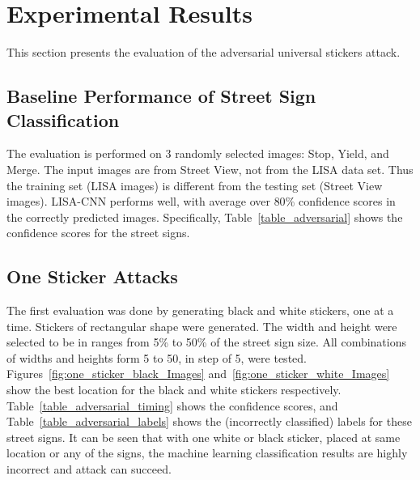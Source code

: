 \section{Experimental Results}
\label{experimental_results}

This section presents the evaluation of the adversarial universal stickers attack.


\subsection{Baseline Performance of Street Sign Classification}

The evaluation is performed on 3 randomly selected images: Stop, Yield, and Merge. The input images are from Street View, not from the LISA data set. Thus the training set (LISA images) is different from the testing set (Street View images). LISA-CNN performs well, with average over $80$\% confidence scores in the correctly predicted images. Specifically, Table~\ref{table_adversarial} shows the confidence scores for the street signs.



\subsection{One Sticker Attacks}

The first evaluation was done by generating black and white stickers, one at a time. Stickers of rectangular shape were generated. The width and height were selected to be in ranges from 5\% to 50\% of the street sign size. All combinations of widths and heights form 5 to 50, in step of 5, were tested. Figures~\ref{fig:one_sticker_black_Images} and~\ref{fig:one_sticker_white_Images} show the best location for the black and white stickers respectively. Table~\ref{table_adversarial_timing} shows the confidence scores, and Table~\ref{table_adversarial_labels} shows the (incorrectly classified) labels for these street signs. It can be seen that with one white or black sticker, placed at same location or any of the signs, the machine learning classification results are highly incorrect and attack can succeed.




